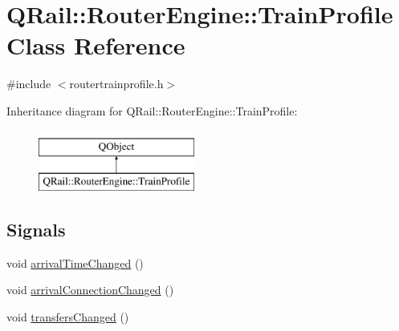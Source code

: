 \hypertarget{classQRail_1_1RouterEngine_1_1TrainProfile}{}\section{Q\+Rail\+::Router\+Engine\+::Train\+Profile Class Reference}
\label{classQRail_1_1RouterEngine_1_1TrainProfile}


{\ttfamily \#include $<$routertrainprofile.\+h$>$}

Inheritance diagram for Q\+Rail\+::Router\+Engine\+::Train\+Profile\+:\begin{figure}[H]
\begin{center}
\leavevmode
\includegraphics[height=2.000000cm]{classQRail_1_1RouterEngine_1_1TrainProfile}
\end{center}
\end{figure}
\subsection*{Signals}
\begin{DoxyCompactItemize}
\item 
void \mbox{\hyperlink{classQRail_1_1RouterEngine_1_1TrainProfile_a099161c4f6ba2191d4b35049daae4e79}{arrival\+Time\+Changed}} ()
\item 
void \mbox{\hyperlink{classQRail_1_1RouterEngine_1_1TrainProfile_a590b952fef66d980823ba3053ed613c0}{arrival\+Connection\+Changed}} ()
\item 
void \mbox{\hyperlink{classQRail_1_1RouterEngine_1_1TrainProfile_a10f6782179dec9835a7f38f8508dd396}{transfers\+Changed}} ()
\end{DoxyCompactItemize}
